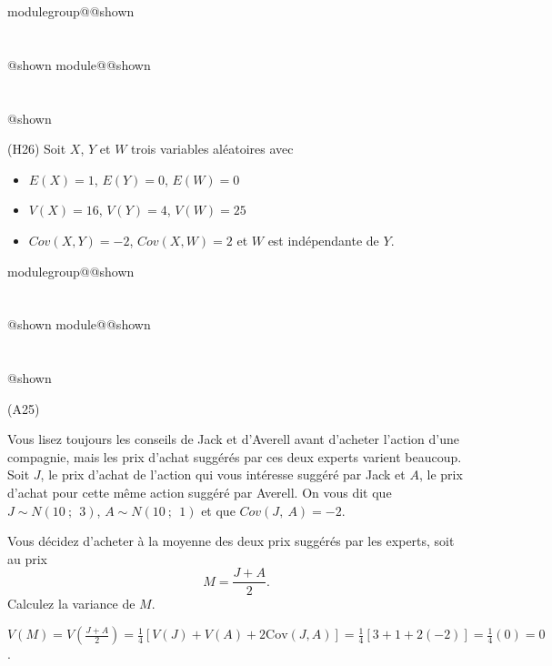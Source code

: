 \documentclass{Evaluation}
\makeatletter
\newcommand{\currentmodulekey}{}
\newcommand{\currentmoduletitle}{}
\newcommand{\currentgroupkey}{}
\newcommand{\currentgrouptitle}{}
\newcommand{\showmoduleifneeded}{%
  \ifx\currentgroupkey\empty\else
    \expandafter\ifx\csname modulegroup@\currentgroupkey @shown\endcsname\relax
      \section*{\currentgrouptitle}%
      \expandafter\gdef\csname modulegroup@\currentgroupkey @shown\endcsname{1}%
    \fi
  \fi
  \expandafter\ifx\csname module@\currentmodulekey @shown\endcsname\relax
    \section*{\currentmoduletitle}%
    \expandafter\gdef\csname module@\currentmodulekey @shown\endcsname{1}%
  \fi
}
\newenvironment{A25}{\showmoduleifneeded}{}
\newenvironment{H26}{\showmoduleifneeded}{}
\makeatother
\begin{document}
\begin{questions}
\begin{H26}
\question {}\label{cov}
(H26)
Soit $X$, $Y$ et $W$ trois variables aléatoires avec
\begin{itemize}
\item $E(X)=1$, $E(Y)=0$, $E(W)=0$
\item $V(X)=16$, $V(Y)=4$, $V(W)=25$
\item $Cov(X,Y)=-2$, $Cov(X,W)=2$ et $W$ est indépendante de $Y$.
\end{itemize}


\end{H26}

\begin{A25}
\question {}\label{2F} (A25)

Vous lisez toujours les conseils de Jack et d'Averell avant d'acheter l'action
d'une compagnie, mais les prix d'achat suggérés par ces deux experts
varient beaucoup. Soit $J$, le prix d'achat de l'action qui vous intéresse suggéré
par Jack et $A$, le prix d'achat pour cette même action suggéré par Averell.
On vous dit que $J\sim N(10~;~~3)$, $A\sim N(10~;~~1)$ et que $Cov(J,~A)=-2$.

Vous décidez d'acheter à la moyenne des deux
    prix suggérés par les experts, soit au prix
    $$M = \frac{J+A}{2}.$$
Calculez la variance de $M$.

\begin{solution}
    $V(M)=V\left(\frac{J+A}{2}\right)=\frac{1}{4}[V(J)+V(A)+2\text{Cov}(J,A)]=\frac{1}{4}[3+1+2(-2)]=\frac{1}{4}(0)=0$.
\end{solution}
\end{A25}


\end{questions}
\end{document}
